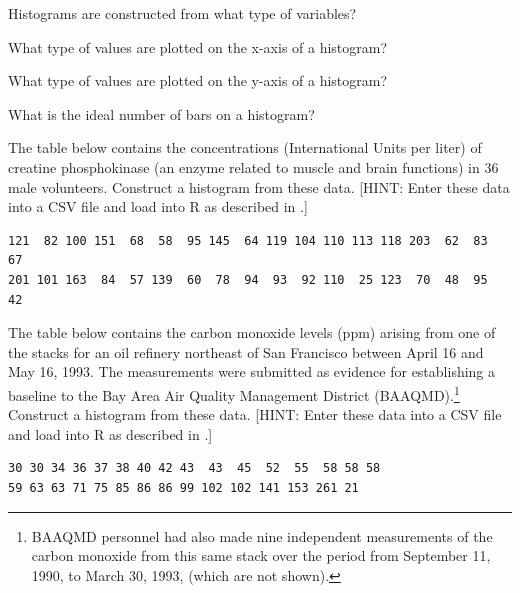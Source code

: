 \documentclass[10pt,openany]{book}\usepackage[]{graphicx}\usepackage[]{color}
\begin{document}
\begin{exsection}
  \item \label{revex:quEDAHistVar} Histograms are constructed from what type of variables? 
  \item \label{revex:quEDAHistX} What type of values are plotted on the x-axis of a histogram? 
  \item \label{revex:quEDAHistY} What type of values are plotted on the y-axis of a histogram? 
  \item \label{revex:quEDAHistBins} What is the ideal number of bars on a histogram? 
  \item \label{revex:quEDACreatPhosph} \rhw{} The table below contains the concentrations (International Units per liter) of creatine phosphokinase (an enzyme related to muscle and brain functions) in 36 male volunteers.  Construct a histogram from these data.  [HINT: Enter these data into a CSV file and load into R as described in .]
    \begin{Verbatim}[xleftmargin=5mm]
121  82 100 151  68  58  95 145  64 119 104 110 113 118 203  62  83  67
201 101 163  84  57 139  60  78  94  93  92 110  25 123  70  48  95  42
    \end{Verbatim}
  \item \label{revex:quEDAAirPolln} \rhw{} The table below contains the carbon monoxide levels (ppm) arising from one of the stacks for an oil refinery northeast of San Francisco between April 16 and May 16, 1993. The measurements were submitted as evidence for establishing a baseline to the Bay Area Air Quality Management District (BAAQMD).\footnote{BAAQMD personnel had also made nine independent measurements of the carbon monoxide from this same stack over the period from September 11, 1990, to March 30, 1993, (which are not shown).}  Construct a histogram from these data.  [HINT: Enter these data into a CSV file and load into R as described in .]
    \begin{Verbatim}[xleftmargin=5mm]
30 30 34 36 37 38 40 42 43  43  45  52  55  58 58 58
59 63 63 71 75 85 86 86 99 102 102 141 153 261 21
    \end{Verbatim}
\end{exsection}
\end{document}
